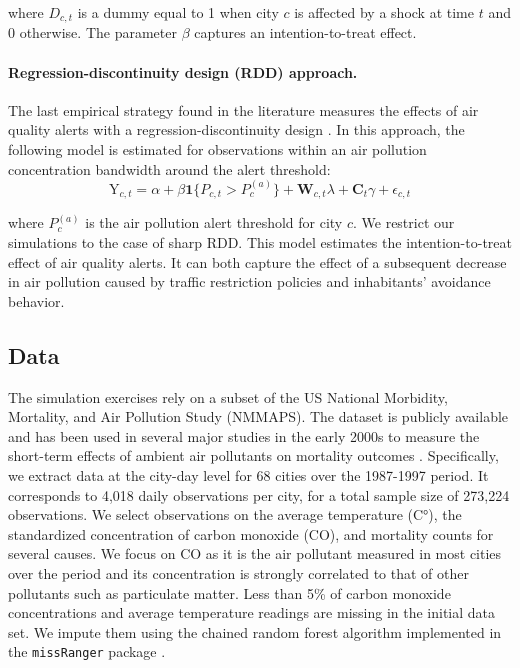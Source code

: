 \documentclass[12pt]{article}
\begin{document}
        \noindent where $D_{c,t}$ is a dummy equal to 1 when city $c$ is affected by a shock at time $t$ and 0 otherwise. The parameter $\beta$ captures an intention-to-treat effect.

        \begin{sloppypar}
        \paragraph{Regression-discontinuity design (RDD) approach.} The last empirical strategy found in the literature measures the effects of air quality alerts with a regression-discontinuity design \citep{chen_effect_2018, anderson2022bounds}. In this approach, the following model is estimated for observations within an air pollution concentration bandwidth around the alert threshold:
        ~
        \begin{equation*}
        \text{Y}_{c,t} = \alpha + \beta \textbf{1}\{P_{c,t} > P^{(a)}_{c}\} + \textbf{W}_{c,t}\lambda + \textbf{C}_{t}\gamma + \epsilon_{c,t}
        \end{equation*}
        \end{sloppypar}
        
        \noindent where $P^{(a)}_{c}$ is the air pollution alert threshold for city $c$. We restrict our simulations to the case of sharp RDD. This model estimates the intention-to-treat effect of air quality alerts.  It can both capture the effect of a subsequent decrease in air pollution caused by traffic restriction policies and inhabitants' avoidance behavior. 
        
        \subsection{Data}
        
        The simulation exercises rely on a subset of the US National Morbidity, Mortality, and Air Pollution Study (NMMAPS). The dataset is publicly available and has been used in several major studies in the early 2000s to measure the short-term effects of ambient air pollutants on mortality outcomes \citep{peng2008statistical}. Specifically, we extract data at the city-day level for 68 cities over the 1987-1997 period. It corresponds to 4,018 daily observations per city, for a total sample size of 273,224 observations. We select observations on the average temperature (C°), the standardized concentration of carbon monoxide (CO), and mortality counts for several causes. We focus on CO as it is the air pollutant measured in most cities over the period and its concentration is strongly correlated to that of other pollutants such as particulate matter. Less than 5\% of carbon monoxide concentrations and average temperature readings are missing in the initial data set. We impute them using the chained random forest algorithm implemented in the \texttt{missRanger} package \citep{mayer_missranger_2019}.
        
\end{document}
